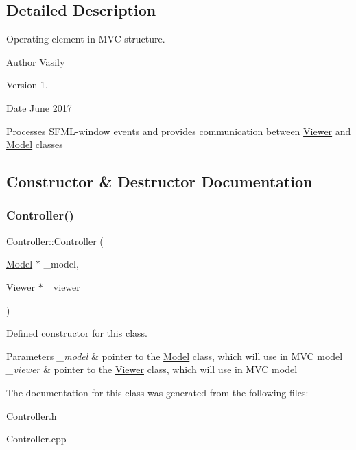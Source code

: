 \subsection{Detailed Description}
Operating element in M\+VC structure. 

\begin{DoxyAuthor}{Author}
Vasily 
\end{DoxyAuthor}
\begin{DoxyVersion}{Version}
1. 
\end{DoxyVersion}
\begin{DoxyDate}{Date}
June 2017
\end{DoxyDate}
Processes S\+F\+M\+L-\/window events and provides communication between \hyperlink{class_viewer}{Viewer} and \hyperlink{class_model}{Model} classes 

\subsection{Constructor \& Destructor Documentation}
\mbox{\label{class_controller_ae2231c787d852af79c95433cf30cbe9f}} 
\subsubsection{\texorpdfstring{Controller()}{Controller()}}
{\footnotesize\ttfamily Controller\+::\+Controller (\begin{DoxyParamCaption}\item[{\hyperlink{class_model}{Model} $\ast$}]{\+\_\+model,  }\item[{\hyperlink{class_viewer}{Viewer} $\ast$}]{\+\_\+viewer }\end{DoxyParamCaption})}



Defined constructor for this class. 


\begin{DoxyParams}{Parameters}
{\em \+\_\+model} & pointer to the \hyperlink{class_model}{Model} class, which will use in M\+VC model \\
\hline
{\em \+\_\+viewer} & pointer to the \hyperlink{class_viewer}{Viewer} class, which will use in M\+VC model \\
\hline
\end{DoxyParams}


The documentation for this class was generated from the following files\+:\begin{DoxyCompactItemize}
\item 
\hyperlink{_controller_8h}{Controller.\+h}\item 
Controller.\+cpp\end{DoxyCompactItemize}
